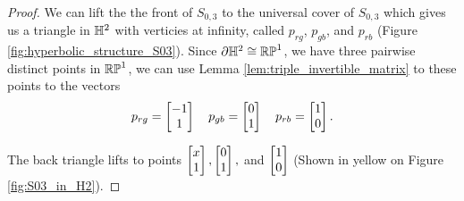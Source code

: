 \documentclass{amsart}
\begin{document}
	\begin{proof}
		We can lift the the front of $S_{0,3}$ to the universal cover of $S_{0,3}$ which gives us a triangle in $\mathbb{H}^2$ with verticies at infinity, called $p_{rg}$, $p_{gb}$, and $p_{rb}$ (Figure \ref{fig:hyperbolic_structure_S03}). Since $\partial \mathbb{H}^2 \cong \mathbb{RP}^1$, we have three pairwise distinct points in $\mathbb{RP}^1$, we can use Lemma \ref{lem:triple_invertible_matrix} to  these points to the vectors
		\begin{equation*}
			p_{rg} = \begin{bmatrix} -1 \\ 1 \end{bmatrix} \quad p_{gb} = \begin{bmatrix} 0 \\ 1 \end{bmatrix} \quad p_{rb} = \begin{bmatrix} 1 \\ 0 \end{bmatrix}.
		\end{equation*}
		
		The back triangle lifts to points $\begin{bmatrix} x \\ 1 \end{bmatrix}, \begin{bmatrix} 0 \\ 1 \end{bmatrix},$ and $\begin{bmatrix} 1 \\ 0 \end{bmatrix}$ (Shown in yellow on Figure \ref{fig:S03_in_H2}).
		

\end{proof}
\end{document}

